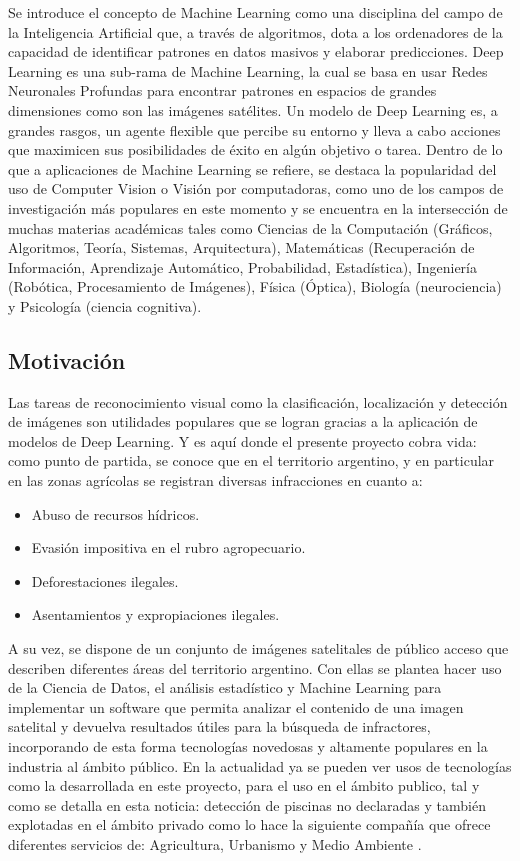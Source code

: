 Se introduce el concepto de Machine Learning como una disciplina del campo de la Inteligencia Artificial que, a través de algoritmos, dota a los ordenadores de la capacidad de identificar patrones en datos masivos y elaborar predicciones. Deep Learning es una sub-rama de Machine Learning, la cual se basa en usar Redes Neuronales Profundas para encontrar patrones en espacios de grandes dimensiones como son las imágenes satélites. Un modelo de Deep Learning es, a grandes rasgos, un agente flexible que percibe su entorno y lleva a cabo acciones que maximicen sus posibilidades de éxito en algún objetivo o tarea. Dentro de lo que a aplicaciones de Machine Learning se refiere, se destaca la popularidad del uso de Computer Vision  o Visión por computadoras, como uno de los campos de investigación más populares en este momento y se encuentra en la intersección de muchas materias académicas tales como Ciencias de la Computación (Gráficos, Algoritmos, Teoría, Sistemas, Arquitectura), Matemáticas (Recuperación de Información, Aprendizaje Automático, Probabilidad, Estadística), Ingeniería (Robótica, Procesamiento de Imágenes), Física (Óptica), Biología (neurociencia) y Psicología (ciencia cognitiva). 
\\

\subsection{Motivación}
Las tareas de reconocimiento visual como la clasificación, localización y detección de imágenes son utilidades populares que se logran gracias a la aplicación de modelos de Deep Learning. Y es aquí donde el presente proyecto cobra vida: como punto de partida, se conoce que en el territorio argentino, y en particular en las zonas agrícolas se registran diversas infracciones en cuanto a:
\begin{itemize}
    \item Abuso de recursos hídricos.
    \item Evasión impositiva en el rubro agropecuario.
    \item Deforestaciones ilegales.
    \item Asentamientos y expropiaciones ilegales.
\end{itemize}
A su vez, se dispone de un conjunto de imágenes satelitales de público acceso que describen diferentes áreas del territorio argentino. Con ellas se plantea hacer uso de la Ciencia de Datos, el análisis estadístico y Machine Learning para implementar un software que permita analizar el contenido de una imagen satelital y devuelva resultados útiles para la búsqueda de infractores, incorporando de esta forma tecnologías novedosas y altamente populares en la industria al ámbito público. En la actualidad ya se pueden ver usos de tecnologías como la desarrollada en este proyecto, para el uso en el ámbito publico, tal y como se detalla en esta noticia: detección de piscinas no declaradas \cite{noticia} y también explotadas en el ámbito privado como lo hace la siguiente compañía que ofrece diferentes servicios de: Agricultura, Urbanismo y Medio Ambiente \cite{kermap}.

